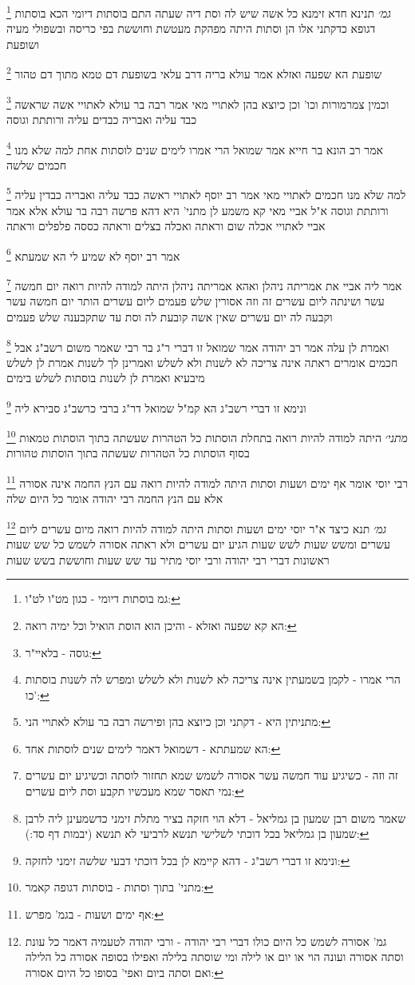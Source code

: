\documentclass[12pt, openany]{book}
\newcommand{\footnotecomment}[1]{
	\renewcommand\thefootnote{}
	\footnote{#1}}
\newcommand{\commenta}[1]{\footnotecomment{#1}}
\begin{document}
{\commenta{גמ בוסתות דיומי - כגון מט"ו לט"ו:}
{\large\emph{גמ׳}} תנינא חדא זימנא כל אשה שיש לה וסת דיה שעתה התם בוסתות דיומי הכא בוסתות דגופא 
כדקתני אלו הן וסתות היתה מפהקת מעטשת וחוששת בפי כריסה ובשפולי מעיה ושופעת 
\commenta{הא קא שפעה ואזלא - והיכן הוא הוסת הואיל וכל ימיה רואה:}
שופעת הא שפעה ואזלא אמר עולא בריה דרב עלאי
בשופעת דם טמא מתוך דם טהור 
\commenta{גוסה - בלאיי"ר:}
וכמין צמרמורות וכו' וכן כיוצא בהן לאתויי מאי אמר רבה בר עולא לאתויי אשה שראשה כבד עליה ואבריה כבדים עליה ורותתת וגוסה 
\commenta{הרי אמרו - לקמן בשמעתין אינה צריכה לא לשנות ולא לשלש ומפרש לה לשנות בוסתות כו':}
אמר רב הונא בר חייא אמר שמואל הרי אמרו לימים שנים לוסתות אחת למה שלא מנו חכמים שלשה 
\commenta{מתניתין היא - דקתני וכן כיוצא בהן ופירשה רבה בר עולא לאתויי הני:}
למה שלא מנו חכמים לאתויי מאי אמר רב יוסף לאתויי ראשה כבד עליה ואבריה כבדין עליה ורותתת וגוסה א"ל אביי מאי קא משמע לן מתני' היא דהא פרשה רבה בר עולא אלא אמר אביי לאתויי אכלה שום וראתה ואכלה בצלים וראתה כססה פלפלים וראתה 
\commenta{הא שמעתתא - דשמואל דאמר לימים שנים לוסתות אחד:}
אמר רב יוסף לא שמיע לי הא שמעתא 
\commenta{זה וזה - כשיגיע עוד חמשה עשר אסורה לשמש שמא תחזור לוסתה וכשיגיע יום עשרים נמי תאסר שמא מעכשיו תקבע וסת ליום עשרים:}
אמר ליה אביי את אמריתה ניהלן ואהא אמריתה ניהלן היתה למודה להיות רואה יום חמשה עשר ושינתה ליום עשרים זה וזה אסורין שלש פעמים ליום עשרים הותר יום חמשה עשר וקבעה לה יום עשרים שאין אשה קובעת לה וסת עד שתקבענה שלש פעמים 
\commenta{שאמר משום רבן שמעון בן גמליאל - דלא הוי חזקה בציר מתלת זימני כדשמעינן ליה לרבן שמעון בן גמליאל בכל דוכתי לשלישי תנשא לרביעי לא תנשא (יבמות דף סד:):}
ואמרת לן עלה אמר רב יהודה אמר שמואל זו דברי ר"ג בר רבי שאמר משום רשב"ג אבל חכמים אומרים ראתה אינה צריכה לא לשנות ולא לשלש 
ואמרינן לך לשנות אמרת לן לשלש מיבעיא ואמרת לן לשנות בוסתות לשלש בימים 
\commenta{ונימא זו דברי רשב"ג - דהא קיימא לן בכל דוכתי דבעי שלשה זימני לחזקה:}
ונימא זו דברי רשב"ג הא קמ"ל שמואל דר"ג ברבי כרשב"ג סבירא ליה
\commenta{מתני' בתוך וסתות - בוסתות דגופה קאמר:}
{\large\emph{מתני׳}} היתה למודה להיות רואה בתחלת הוסתות כל הטהרות שעשתה בתוך הוסתות טמאות בסוף הוסתות כל הטהרות שעשתה בתוך הוסתות טהורות 
\commenta{אף ימים ושעות - בגמ' מפרש:}
רבי יוסי אומר אף ימים ושעות וסתות היתה למודה להיות רואה עם הנץ החמה אינה אסורה אלא עם הנץ החמה רבי יהודה אומר כל היום שלה
\commenta{גמ' אסורה לשמש כל היום כולו דברי רבי יהודה - ורבי יהודה לטעמיה דאמר כל עונת וסתה אסורה ועונה הוי או יום או לילה ומי שוסתה בלילה ואפילו בסופה אסורה כל הלילה ואם וסתה ביום ואפי' בסופו כל היום אסורה:}
{\large\emph{גמ׳}} תנא כיצד א"ר יוסי ימים ושעות וסתות היתה למודה להיות רואה מיום עשרים ליום עשרים ומשש שעות לשש שעות הגיע יום עשרים ולא ראתה אסורה לשמש כל שש שעות ראשונות דברי רבי יהודה ורבי יוסי מתיר עד שש שעות וחוששת בשש שעות 
}
\end{document}
